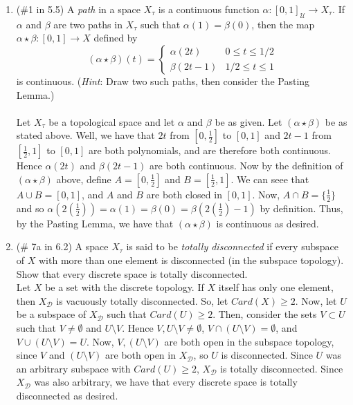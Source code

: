 \documentclass[12pt]{article}
\begin{document}
\begin{enumerate}
\item (\#1 in 5.5) A \textit{path} in a space $X_{\tau}$ is a continuous function $\alpha:[0,1]_{\mathcal{U}}\to X_{\tau}$. If $\alpha$ and $\beta$ are two paths in $X_{\tau}$ such that $\alpha(1) = \beta(0)$, then the map $\alpha \star \beta:[0,1]\to X$ defined by 
\[(\alpha \star \beta)(t)=\left\{ \begin{array}{ll}
                  \alpha(2t) & \mbox{$0\leq t\leq 1/2$}\\
                  \beta(2t-1)      & \mbox{$1/2 \leq t\leq 1$}
                  \end{array}
          \right. \]
 is continuous. (\textit{Hint}: Draw two such paths, then consider the Pasting Lemma.)\\\\
Let $X_{\tau}$ be a topological space and let $\alpha$ and $\beta$ be as given. Let $(\alpha\star\beta)$ be as stated above. Well, we have that $2t$ from $[0,\frac12]$ to $[0,1]$ and $2t-1$ from $[\frac12,1]$ to $[0,1]$ are both polynomials, and are therefore both continuous. Hence $\alpha(2t)$ and $\beta(2t-1)$ are both continuous. Now by the definition of $(\alpha\star\beta)$ above, define $A=[0,\frac12]$ and $B=[\frac12,1]$. We can seee that $A\cup B=[0,1]$, and $A$ and $B$ are both closed in $[0,1]$. Now, $A\cap B=\{\frac12\}$ and so $\alpha(2(\frac12))=\alpha(1)=\beta(0)=\beta(2(\frac12)-1)$ by definition. Thus, by the Pasting Lemma, we have that $(\alpha\star\beta)$ is continuous as desired.\\

 \item (\# 7a in 6.2) A space $X_{\tau}$ is said to be \textit{totally disconnected} if every subspace of $X$ with more than one element is disconnected (in the subspace topology). Show that every discrete space is totally disconnected.\\
Let $X$ be a set with the discrete topology. If $X$ itself has only one element, then $X_{\mathcal{D}}$ is vacuously totally disconnected. So, let $Card(X)\geq2$. Now, let $U$ be a subspace of $X_{\mathcal{D}}$ such that $Card(U)\geq2$. Then, consider the sets $V\subset U$ such that $V\neq\emptyset$ and $U\setminus V$. Hence $V, U\setminus V\neq\emptyset$, $V\cap(U\setminus V)=\emptyset$, and $V\cup(U\setminus V)=U$. Now, $V,(U\setminus V)$ are both open in the subspace topology, since $V$ and $(U\setminus V)$ are both open in $X_{\mathcal{D}}$, so $U$ is disconnected. Since $U$ was an arbitrary subspace with $Card(U)\geq2$, $X_{\mathcal{D}}$ is totally disconnected. Since $X_{\mathcal{D}}$ was also arbitrary, we have that every discrete space is totally disconnected as desired.



\end{enumerate}
\end{document}
